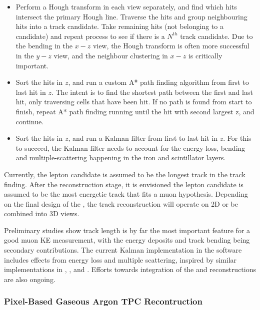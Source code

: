 \documentclass[../main-v1.tex]{subfiles}
\begin{document}
\begin{itemize}
    \item Perform a Hough transform \cite{hough} in each view separately, and find which hits intersect the primary Hough line. Traverse the hits and group neighbouring hits into a track candidate. Take remaining hits (not belonging to a candidate) and repeat process to see if there is a $N^{th}$ track candidate. Due to the bending in the $x-z$ view, the Hough transform is often more successful in the $y-z$ view, and the neighbour clustering in $x-z$ is critically important.

    \item Sort the hits in $z$, and run a custom A* path finding algorithm from first to last hit in $z$. The intent is to find the shortest path between the first and last hit, only traversing cells that have been hit. If no path is found from start to finish, repeat A* path finding running until the hit with second largest z, and continue.
    
    \item Sort the hits in $z$, and run a Kalman filter from first to last hit in $z$. For this to succeed, the Kalman filter needs to account for the energy-loss, bending and multiple-scattering happening in the iron and scintillator layers. 
\end{itemize}

Currently, the lepton candidate is assumed to be the longest track in the track finding. After the reconstruction stage, it is envisioned the lepton candidate is assumed to be the most energetic track that fits a muon hypothesis. Depending on the final design of the , the track reconstruction will operate on 2D or be combined into 3D views. 

Preliminary studies show track length is by far the most important feature for a good muon KE measurement, with the energy deposits and track bending being secondary contributions. The current Kalman implementation in the  software includes effects from energy loss and multiple scattering, inspired by similar implementations in , , and . Efforts towards integration of the  and  reconstructions are also ongoing.

\subsubsection{Pixel-Based Gaseous Argon TPC Recontruction}
\label{sec:algo:reco:gartpc:pixels}
\end{document}
